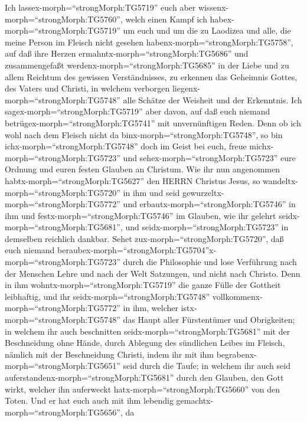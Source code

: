  Ich lassex-morph=``strongMorph:TG5719'' euch aber
wissenx-morph=``strongMorph:TG5760'', welch einen Kampf ich
habex-morph=``strongMorph:TG5719'' um euch und um die zu Laodizea und
alle, die meine Person im Fleisch nicht gesehen
habenx-morph=``strongMorph:TG5758'',  auf daß ihre Herzen
ermahntx-morph=``strongMorph:TG5686'' und zusammengefaßt
werdenx-morph=``strongMorph:TG5685'' in der Liebe und zu allem Reichtum
des gewissen Verständnisses, zu erkennen das Geheimnis Gottes, des
Vaters und Christi,  in welchem verborgen
liegenx-morph=``strongMorph:TG5748'' alle Schätze der Weisheit und der
Erkenntnis.  Ich sagex-morph=``strongMorph:TG5719'' aber
davon, auf daß euch niemand betrügex-morph=``strongMorph:TG5741'' mit
unvernünftigen Reden.  Denn ob ich wohl nach dem Fleisch
nicht da binx-morph=``strongMorph:TG5748'', so bin
ichx-morph=``strongMorph:TG5748'' doch im Geist bei euch, freue
michx-morph=``strongMorph:TG5723'' und
sehex-morph=``strongMorph:TG5723'' eure Ordnung und euren festen Glauben
an Christum.  Wie ihr nun angenommen
habtx-morph=``strongMorph:TG5627'' den HERRN Christus Jesus, so
wandeltx-morph=``strongMorph:TG5720'' in ihm  und seid
gewurzeltx-morph=``strongMorph:TG5772'' und
erbautx-morph=``strongMorph:TG5746'' in ihm und
festx-morph=``strongMorph:TG5746'' im Glauben, wie ihr gelehrt
seidx-morph=``strongMorph:TG5681'', und
seidx-morph=``strongMorph:TG5723'' in demselben reichlich dankbar.
 Sehet zux-morph=``strongMorph:TG5720'', daß euch niemand
beraubex-morph=``strongMorph:TG5704''x-morph=``strongMorph:TG5723''
durch die Philosophie und lose Verführung nach der Menschen Lehre und
nach der Welt Satzungen, und nicht nach Christo.  Denn in
ihm wohntx-morph=``strongMorph:TG5719'' die ganze Fülle der Gottheit
leibhaftig,  und ihr seidx-morph=``strongMorph:TG5748''
vollkommenx-morph=``strongMorph:TG5772'' in ihm, welcher
istx-morph=``strongMorph:TG5748'' das Haupt aller Fürstentümer und
Obrigkeiten;  in welchem ihr auch beschnitten
seidx-morph=``strongMorph:TG5681'' mit der Beschneidung ohne Hände,
durch Ablegung des sündlichen Leibes im Fleisch, nämlich mit der
Beschneidung Christi,  indem ihr mit ihm
begrabenx-morph=``strongMorph:TG5651'' seid durch die Taufe; in welchem
ihr auch seid auferstandenx-morph=``strongMorph:TG5681'' durch den
Glauben, den Gott wirkt, welcher ihn auferweckt
hatx-morph=``strongMorph:TG5660'' von den Toten.  Und er
hat euch auch mit ihm lebendig gemachtx-morph=``strongMorph:TG5656'', da
